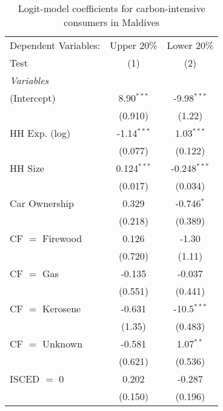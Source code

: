 
\begin{table}[htbp!]
   \centering
   \small
   \begin{adjustbox}{width = 1\textwidth, max height = 0.95\textheight, center}
      \begin{threeparttable}[b]
         \caption{\label{tab:Logit_1_MDV} Logit-model coefficients for carbon-intensive consumers in Maldives}
         \begin{tabular}{lcc}
            \tabularnewline \midrule \midrule
            Dependent Variables: & Upper 20\%    & Lower 20\%\\   
            Test                 & (1)           & (2)\\  
            \midrule
            \emph{Variables}\\
            (Intercept)          & 8.90$^{***}$  & -9.98$^{***}$\\   
                                 & (0.910)       & (1.22)\\   
            HH Exp. (log)        & -1.14$^{***}$ & 1.03$^{***}$\\   
                                 & (0.077)       & (0.122)\\   
            HH Size              & 0.124$^{***}$ & -0.248$^{***}$\\   
                                 & (0.017)       & (0.034)\\   
            Car Ownership        & 0.329         & -0.746$^{*}$\\   
                                 & (0.218)       & (0.389)\\   
            CF $=$ Firewood      & 0.126         & -1.30\\   
                                 & (0.720)       & (1.11)\\   
            CF $=$ Gas           & -0.135        & -0.037\\   
                                 & (0.551)       & (0.441)\\   
            CF $=$ Kerosene      & -0.631        & -10.5$^{***}$\\   
                                 & (1.35)        & (0.483)\\   
            CF $=$ Unknown       & -0.581        & 1.07$^{**}$\\   
                                 & (0.621)       & (0.536)\\   
            ISCED $=$ 0          & 0.202         & -0.287\\   
                                 & (0.150)       & (0.196)\\   

\end{tabular}
\end{threeparttable}
\end{adjustbox}
\end{table}
